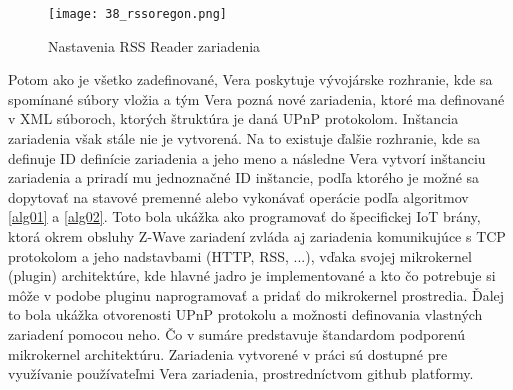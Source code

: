 \begin{figure}[h]
\centering
\texttt{[image: 38\_rssoregon.png]}
\caption{Nastavenia RSS Reader zariadenia}
\label{38_rssoregon}
\end{figure} 
Potom ako je všetko zadefinované, Vera poskytuje vývojárske rozhranie, kde sa spomínané súbory vložia a tým Vera pozná nové zariadenia, ktoré ma definované v XML súboroch, ktorých štruktúra je daná UPnP protokolom. Inštancia zariadenia však stále nie je vytvorená. Na to existuje ďalšie rozhranie, kde sa definuje ID definície zariadenia a jeho meno a následne Vera vytvorí inštanciu zariadenia a priradí mu jednoznačné ID inštancie, podľa ktorého je možné sa dopytovať na stavové premenné alebo vykonávať operácie podľa algoritmov \ref{alg01} a \ref{alg02}. Toto bola ukážka ako programovať do špecifickej IoT brány, ktorá okrem obsluhy Z-Wave zariadení zvláda aj zariadenia komunikujúce s TCP protokolom a jeho nadstavbami (HTTP, RSS, ...), vďaka svojej mikrokernel (plugin) architektúre, kde hlavné jadro je implementované a kto čo potrebuje si môže v podobe pluginu naprogramovať a pridať do mikrokernel prostredia.  Ďalej to bola ukážka otvorenosti UPnP protokolu a možnosti definovania vlastných zariadení pomocou neho. Čo v sumáre predstavuje štandardom podporenú mikrokernel architektúru. Zariadenia vytvorené v práci sú dostupné pre využívanie používateľmi Vera zariadenia, prostredníctvom github platformy.
